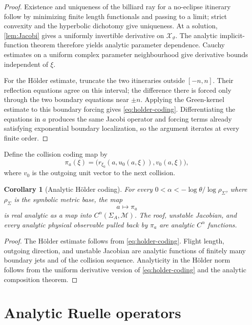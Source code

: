 \documentclass[11pt,reqno]{amsart}
\newtheorem{corollary}[theorem]{Corollary}
\theoremstyle{definition}
\theoremstyle{remark}
\newcommand{\X}{\mathcal X}
\begin{document}
\begin{proof}
Existence and uniqueness of the billiard ray for a no-eclipse itinerary follow
by minimizing finite length functionals and passing to a limit; strict
convexity and the hyperbolic dichotomy give uniqueness.  At a solution,
\cref{lem:Jacobi} gives a uniformly invertible derivative on
$\X_\vartheta$.  The analytic implicit-function theorem therefore yields
analytic parameter dependence.  Cauchy estimates on a uniform complex
parameter neighbourhood give derivative bounds independent of $\xi$.

For the Hölder estimate, truncate the two itineraries outside
$[-n,n]$.  Their reflection equations agree on this interval; the difference
there is forced only through the two boundary equations near $\pm n$.
Applying the Green-kernel estimate to this boundary forcing gives
\eqref{eq:holder-coding}.  Differentiating the equations in $a$ produces the
same Jacobi operator and forcing terms already satisfying exponential boundary
localization, so the argument iterates at every finite order.
\end{proof}

Define the collision coding map by
\[
 \pi_a(\xi)=
 \bigl(r_{\xi_0}(a,u_0(a,\xi)),v_0(a,\xi)\bigr),
\]
where $v_0$ is the outgoing unit vector to the next collision.

\begin{corollary}[Analytic Hölder coding]\label{cor:coding}
For every $0<\alpha<-\log\theta/\log\rho_\Sigma$, where $\rho_\Sigma$ is the
symbolic metric base, the map
\[
 a\longmapsto\pi_a
\]
is real analytic as a map into $C^\alpha(\Sigma_A,\mathcal M)$.  The roof,
unstable Jacobian, and every analytic physical observable pulled back by
$\pi_a$ are analytic $C^\alpha$ functions.
\end{corollary}

\begin{proof}
The Hölder estimate follows from \eqref{eq:holder-coding}.  Flight length,
outgoing direction, and unstable Jacobian are analytic functions of finitely
many boundary jets and of the collision sequence.  Analyticity in the Hölder
norm follows from the uniform derivative version of
\eqref{eq:holder-coding} and the analytic composition theorem.
\end{proof}

\section{Analytic Ruelle operators}
\end{document}

